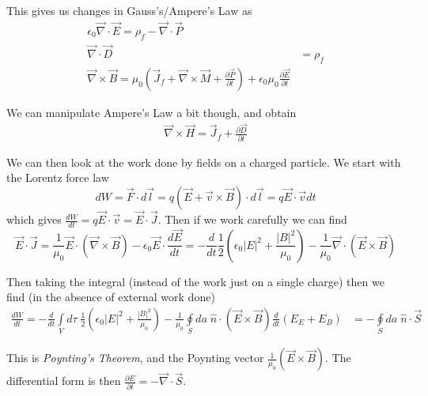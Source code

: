 \documentclass[10pt]{report}
\newcommand{\rd}[2]{\frac{d#1}{d#2}}
\newcommand{\pd}[2]{\frac{\partial #1}{\partial#2}}
\newcommand{\abs}[1]{\left|#1\right|}
\begin{document}
This gives us changes in Gauss's/Ampere's Law as
\begin{align}
    \epsilon_0 \vec{\nabla} \cdot \vec{E} = \rho_f - \vec{\nabla} \cdot \vec{P}\\
    \vec{\nabla} \cdot \vec{D} &= \rho_f\\
    \vec{\nabla} \times \vec{B} = \mu_0\left(  \vec{J}_f + \vec{\nabla} \times \vec{M} + \pd{\vec{P}}{t}\right) + \epsilon_0\mu_0\pd{\vec{E}}{t}
\end{align}

We can manipulate Ampere's Law a bit though, and obtain
\begin{align}
    \vec{\nabla} \times \vec{H} = \vec{J}_f + \pd{\vec{D}}{t}
\end{align}

We can then look at the work done by fields on a charged particle. We start with the Lorentz force law
\begin{equation}
    dW = \vec{F} \cdot d\vec{l} = q\left( \vec{E} + \vec{v} \times \vec{B} \right)\cdot d\vec{l} = q\vec{E} \cdot \vec{v}dt
\end{equation}
which gives $\rd{W}{t} = q\vec{E} \cdot \vec{v} = \vec{E} \cdot \vec{J}$. Then if we work carefully we can find
\begin{equation}
    \vec{E} \cdot \vec{J} = \frac{1}{\mu_0}\vec{E} \cdot \left( \vec{\nabla} \times \vec{B} \right) - \epsilon_0 \vec{E} \cdot \rd{\vec{E}}{t} = -\rd{}{t}\frac{1}{2}\left( \epsilon_0\abs{E}^2 + \frac{\abs{B}^2}{\mu_0} \right) - \frac{1}{\mu_0}\vec{\nabla} \cdot \left( \vec{E} \times \vec{B} \right)
\end{equation}

Then taking the integral (instead of the work just on a single charge) then we find (in the absence of external work done)
\begin{align}
    \rd{W}{t} = -\rd{}{t}\int\limits_{V}^{}d\tau\;\frac{1}{2}\left( \epsilon_0\abs{E}^2 + \frac{\abs{B}^2}{\mu_0} \right) - \frac{1}{\mu_0}\oint\limits_S da\; \hat{n} \cdot \left( \vec{E} \times \vec{B} \right)
    \rd{}{t}\left( E_E + E_B \right) &= -\oint\limits_S da \;\hat{n} \cdot \vec{S}
\end{align}

This is \emph{Poynting's Theorem}, and the Poynting vector $\frac{1}{\mu_0}\left( \vec{E} \times \vec{B} \right)$. The differential form is then $\pd{E}{t} = -\vec{\nabla} \cdot \vec{S}$. 
\end{document}
